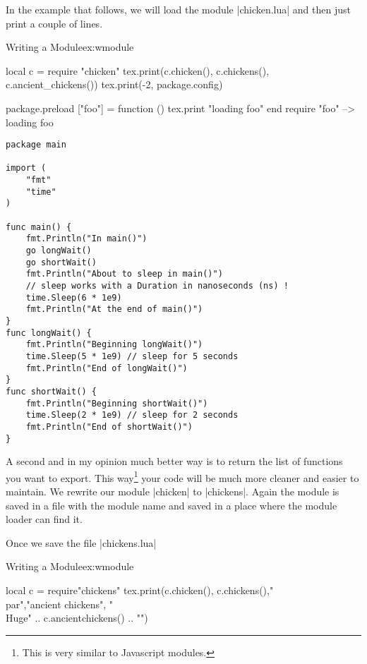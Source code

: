 In the example that follows, we will load the module |chicken.lua| and then just print a couple of lines.
\begin{luaexample}{Writing a Module}{ex:wmodule}
\begin{luacode*}
local c = require "chicken"
      tex.print(c.chicken(), c.chickens(), c.ancient_chickens())
      tex.print(-2, package.config)
      
      package.preload ["foo"] = function () tex.print "loading foo" end
require "foo"  --> loading foo
\end{luacode*}
\end{luaexample}


\begin{lstlisting}
package main

import (
	"fmt"
	"time"
)

func main() {
	fmt.Println("In main()")
	go longWait()
	go shortWait()
	fmt.Println("About to sleep in main()")
	// sleep works with a Duration in nanoseconds (ns) !
	time.Sleep(6 * 1e9)
	fmt.Println("At the end of main()")
}
func longWait() {
	fmt.Println("Beginning longWait()")
	time.Sleep(5 * 1e9) // sleep for 5 seconds
	fmt.Println("End of longWait()")
}
func shortWait() {
	fmt.Println("Beginning shortWait()")
	time.Sleep(2 * 1e9) // sleep for 2 seconds
	fmt.Println("End of shortWait()")
}

\end{lstlisting}



A second and in my opinion much better way is to return the list of functions you want to export. This way\footnote{This is very similar to Javascript modules.} your code will be much more cleaner and easier to maintain. We rewrite our module |chicken|  to |chickens|. Again the module is saved in a file with the module name and saved in a place where the module loader can find it. 

Once we save the file |chickens.lua|

\begin{texexample}{Writing a Module}{ex:wmodule}
\begin{luacode}
   local c = require"chickens"
   tex.print(c.chicken(), c.chickens(),"\\par","ancient chickens", "{\\Huge" .. c.ancientchickens() .. "}")
\end{luacode}
\end{texexample}



